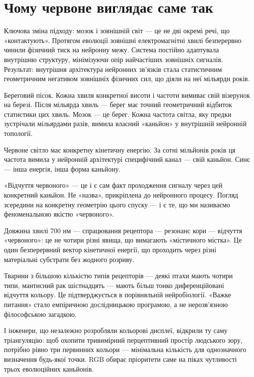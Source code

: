 \documentclass[12pt, a4paper, openany]{book}
\begin{document}
\section{Чому червоне виглядає саме так}

Ключова зміна підходу: мозок і зовнішній світ --- це не дві окремі речі, що «контактують». Протягом еволюції зовнішні електромагнітні хвилі безперервно чинили фізичний тиск на нейронну межу. Система постійно адаптувала внутрішню структуру, мінімізуючи опір найчастіших зовнішніх сигналів. Результат: внутрішня архітектура нейронних зв'язків стала статистичним геометричним негативом зовнішніх фізичних сил, що діяли на неї мільярди років.

\begin{analogybox}
Береговий пісок. Кожна хвиля конкретної висоти і частоти вимиває свій візерунок на березі. Після мільярда хвиль --- берег має точний геометричний відбиток статистики цих хвиль. Мозок --- це берег. Кожна частота світла, яку предки зустрічали мільярдами разів, вимила власний «каньйон» у внутрішній нейронній топології.
\end{analogybox}

Червоне світло має конкретну кінетичну енергію. За сотні мільйонів років ця частота вимила у нейронній архітектурі специфічний канал --- свій каньйон. Синє --- інша енергія, інша форма каньйону.

«Відчуття червоного» --- це і є сам факт проходження сигналу через цей конкретний каньйон. Не «назва», прикріплена до нейронного процесу. Погляд зсередини на конкретну геометрію цього спуску --- і є те, що ми називаємо феноменальною якістю «червоного».

Довжина хвилі 700 нм --- спрацювання рецептора --- резонанс кори --- відчуття «червоного»: це не чотири різні явища, що вимагають «містичного містка». Це один безперервний вектор кінетичної енергії, що проходить через різні матеріальні субстрати без жодного розриву.

Тварини з більшою кількістю типів рецепторів --- деякі птахи мають чотири типи, мантисний рак шістнадцять --- мають більш тонко диференційовані відчуття кольору. Це підтверджується в порівняльній нейробіології. «Важке питання» стало емпіричною дослідницькою програмою, а не нерозв'язною філософською загадкою.

І інженери, що незалежно розробляли кольорові дисплеї, відкрили ту саму тріангуляцію: щоб охопити тривимірний перцептивний простір людського зору, потрібно рівно три первинних кольори --- мінімальна кількість для однозначного визначення будь-якої точки. RGB обирає пріоритети саме на піках чутливості трьох еволюційних каньйонів.
\end{document}
